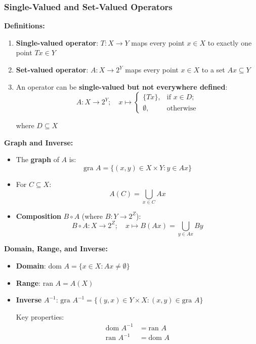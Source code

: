 \documentclass[aspectratio=169,10pt]{beamer}
\begin{document}
\begin{frame}[allowframebreaks]
\frametitle{Single-Valued and Set-Valued Operators}

\textbf{Definitions:}
\begin{enumerate}
\item \textbf{Single-valued operator}: $T: X \to Y$ maps every point $x \in X$ to exactly one point $Tx \in Y$

\item \textbf{Set-valued operator}: $A: X \to 2^Y$ maps every point $x \in X$ to a set $Ax \subseteq Y$

\item An operator can be \textbf{single-valued but not everywhere defined}:
$$A: X \to 2^Y; \quad x \mapsto \begin{cases} \{Tx\}, & \text{if } x \in D; \\ \emptyset, & \text{otherwise} \end{cases}$$

where $D \subseteq X$
\end{enumerate}

\framebreak

\textbf{Graph and Inverse:}
\begin{itemize}
\item The \textbf{graph} of $A$ is:
$$\text{gra } A = \{(x, y) \in X \times Y : y \in Ax\}$$

\item For $C \subseteq X$: 
$$A(C) = \bigcup_{x \in C} Ax$$

\item \textbf{Composition} $B \circ A$ (where $B: Y \to 2^Z$):
$$B \circ A: X \to 2^Z; \quad x \mapsto B(Ax) = \bigcup_{y \in Ax} By$$
\end{itemize}

\framebreak

\textbf{Domain, Range, and Inverse:}
\begin{itemize}
\item \textbf{Domain}: $\text{dom } A = \{x \in X : Ax \neq \emptyset\}$
\item \textbf{Range}: $\text{ran } A = A(X)$
\item \textbf{Inverse} $A^{-1}$: $\text{gra } A^{-1} = \{(y,x) \in Y \times X : (x,y) \in \text{gra } A\}$

Key properties:
\begin{align*}
\text{dom } A^{-1} &= \text{ran } A \\
\text{ran } A^{-1} &= \text{dom } A
\end{align*}
\end{itemize}

\end{frame}
\end{document}
